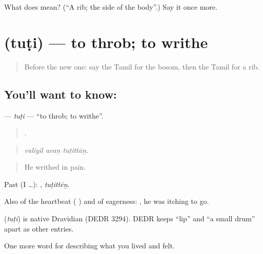 \begin{tcolorbox}[breakable,colback=teal!4,colframe=teal!35!black,title={Before you move on}]
What does  mean? (\textquotedblleft{}A rib; the side of the body\textquotedblright{}.) Say it once more.
\end{tcolorbox}
\section[\texorpdfstring{\ta{துடி} (tuṭi)}{துடி (tuṭi)}]{ (tuṭi) — to throb; to writhe}

\label{lesson:TA-C479-tuti}



\begin{quote}
Before the new one: say the Tamil for the bosom, then the Tamil for a rib.
\end{quote}

\subsection*{You'll want to know: }
\textbf{} — \emph{tuṭi} — \textquotedblleft{}to throb; to writhe\textquotedblright{}.

\begin{quote}
  .
\end{quote}

\begin{quote}
\emph{valiyil avaṉ tuṭittāṉ.}
\end{quote}

\begin{quote}
He writhed in pain.
\end{quote}

Past (I …): , \emph{tuṭittēṉ}.

Also of the heartbeat ( ) and of eagerness:  , he was itching to go.

\begin{cousinweb}
\textbf{} (\emph{tuṭi}) is native Dravidian (DEDR 3294). DEDR keeps  \textquotedblleft{}lip\textquotedblright{} and  \textquotedblleft{}a small drum\textquotedblright{} apart as other entries.
\end{cousinweb}

\begin{grammarlens}[title={What you've built}]
One more word for describing what you lived and felt.
\end{grammarlens}

